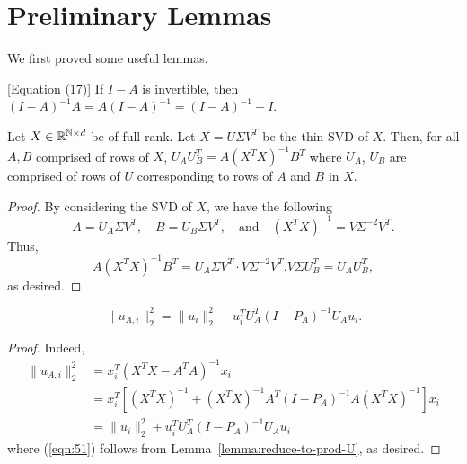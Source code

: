 \section{Preliminary Lemmas}


We first proved some useful lemmas.

\begin{lemma} \cite{gittens2023}[Equation (17)] \label{lemma:cmi2023-17} If $I - A$ is invertible, then $(I - A)^{-1} A = A(I - A)^{-1} = (I - A)^{-1} - I$.
\end{lemma}

\begin{lemma} \label{lemma:reduce-to-prod-U}
    Let $X \in \mathbb{R}^{\mathbb{N} \times d}$ be of full rank. Let $X = U \Sigma V^T$ be the thin SVD of $X$. Then, for all $A, B$ comprised of rows of $X$, $U_A U_B^T = A (X^TX)^{-1}B^T$ where $U_A$, $U_B$ are comprised of rows of $U$ corresponding to rows of $A$ and $B$ in $X$.
\end{lemma}

\begin{proof}
    By considering the SVD of $X$, we have the following
    \begin{equation}
        A = U_A \Sigma V^T, \quad B = U_B \Sigma V^T, \quad \text{and} \quad
        (X^TX)^{-1} = V \Sigma^{-2}V^T.
    \end{equation}
    Thus,
    \begin{equation}
        A (X^TX)^{-1} B^T = U_A \Sigma V^T \cdot V \Sigma^{-2}V^T. V  \Sigma U_B^T = U_A U_B^T,
    \end{equation}
    as desired.
\end{proof}



\begin{lemma} \label{lemma:u_Ai-norm}
    \begin{equation}        
        \lVert u_{A, i} \rVert_2^2 = \lVert u_i \rVert_2^2 + u_i^T U_A^T (I - P_A)^{-1} U_A u_i.
    \end{equation}
\end{lemma}
\begin{proof}
    Indeed,
    \begin{align}
        \lVert u_{A, i} \rVert_2^2 &= x_i^T (X^T X - A^T A)^{-1} x_i\\
        &= x_i^T \left[ (X^T X)^{-1} + (X^T X)^{-1} A^T (I - P_A)^{-1} A (X^T X)^{-1}  \right] x_i\\
        &= \lVert u_i \rVert_2^2 + u_i^T U_A^T (I - P_A)^{-1} U_A u_i \label{eqn:51}
    \end{align}
    where (\ref{eqn:51}) follows from Lemma~\ref{lemma:reduce-to-prod-U}, as desired.
\end{proof}


